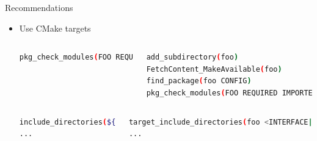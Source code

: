 \documentclass{beamer}
\begin{document}
\begin{frame}[fragile]{Recommendations}\small%
	\begin{itemize}
		\item Use CMake targets%
			\begin{columns}
				\begin{lstlisting}[language=sh]
pkg_check_modules(FOO REQUIRED foo)
				\end{lstlisting}%
				\begin{lstlisting}[language=sh]
add_subdirectory(foo)
FetchContent_MakeAvailable(foo)
find_package(foo CONFIG)
pkg_check_modules(FOO REQUIRED IMPORTED_TARGET foo)
				\end{lstlisting}%
			\end{columns}
			\begin{columns}
				\begin{lstlisting}[language=sh]
include_directories(${utils_INCLUDE_DIRS})
...
				\end{lstlisting}%
				\begin{lstlisting}[language=sh]
target_include_directories(foo <INTERFACE|PUBLIC|PRIVATE> ${utils_INCLUDE_DIRS})
...
				\end{lstlisting}%
			\end{columns}
	\end{itemize}
\end{frame}
\end{document}
